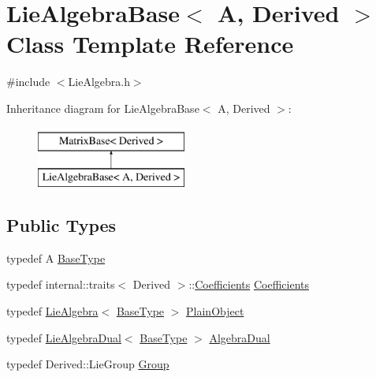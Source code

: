 \hypertarget{class_lie_algebra_base}{}\section{Lie\+Algebra\+Base$<$ A, Derived $>$ Class Template Reference}
\label{class_lie_algebra_base}


{\ttfamily \#include $<$Lie\+Algebra.\+h$>$}

Inheritance diagram for Lie\+Algebra\+Base$<$ A, Derived $>$\+:\begin{figure}[H]
\begin{center}
\leavevmode
\includegraphics[height=2.000000cm]{class_lie_algebra_base}
\end{center}
\end{figure}
\subsection*{Public Types}
\begin{DoxyCompactItemize}
\item 
typedef A \hyperlink{class_lie_algebra_base_ae7884e2973ffa35f8b209b2831a066a1}{Base\+Type}
\item 
typedef internal\+::traits$<$ Derived $>$\+::\hyperlink{class_lie_algebra_base_a8e61a02d3c5f7a0b4bd87a4ccd47dc9a}{Coefficients} \hyperlink{class_lie_algebra_base_a8e61a02d3c5f7a0b4bd87a4ccd47dc9a}{Coefficients}
\item 
typedef \hyperlink{class_lie_algebra}{Lie\+Algebra}$<$ \hyperlink{class_lie_algebra_base_ae7884e2973ffa35f8b209b2831a066a1}{Base\+Type} $>$ \hyperlink{class_lie_algebra_base_a360d9c7789cab342ccfc3bff779aba6e}{Plain\+Object}
\item 
typedef \hyperlink{class_lie_algebra_dual}{Lie\+Algebra\+Dual}$<$ \hyperlink{class_lie_algebra_base_ae7884e2973ffa35f8b209b2831a066a1}{Base\+Type} $>$ \hyperlink{class_lie_algebra_base_a295c784d24a14e39763f3ff5c2abd155}{Algebra\+Dual}
\item 
typedef Derived\+::\+Lie\+Group \hyperlink{class_lie_algebra_base_aab4a5b7a728102ffe801534c0fc10d79}{Group}
\end{DoxyCompactItemize}
